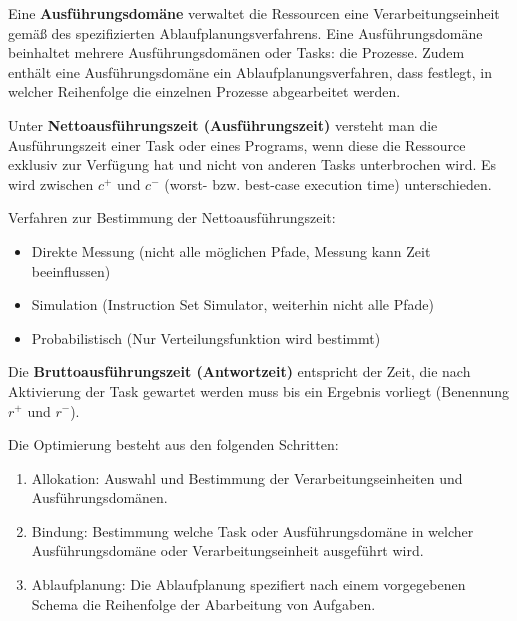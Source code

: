 \begin{tcolorbox}
    Eine \textbf{Ausführungsdomäne} verwaltet die Ressourcen eine Verarbeitungseinheit
    gemäß des spezifizierten Ablaufplanungsverfahrens. Eine Ausführungsdomäne
    beinhaltet mehrere Ausführungsdomänen oder Tasks: die Prozesse.
    Zudem enthält eine Ausführungsdomäne ein Ablaufplanungsverfahren, dass festlegt,
    in welcher Reihenfolge die einzelnen Prozesse abgearbeitet werden.
\end{tcolorbox}

\begin{tcolorbox}
    Unter \textbf{Nettoausführungszeit (Ausführungszeit)} versteht man die Ausführungszeit
    einer Task oder eines Programs, wenn diese die Ressource exklusiv zur Verfügung hat
    und nicht von anderen Tasks unterbrochen wird. Es wird zwischen $c^+$ und $c^-$
    (worst- bzw. best-case execution time) unterschieden.
\end{tcolorbox}

Verfahren zur Bestimmung der Nettoausführungszeit:
\begin{itemize}
    \item Direkte Messung (nicht alle möglichen Pfade, Messung kann Zeit beeinflussen)
    \item Simulation (Instruction Set Simulator, weiterhin nicht alle Pfade)
    \item Probabilistisch (Nur Verteilungsfunktion wird bestimmt)
\end{itemize}

\begin{tcolorbox}
    Die \textbf{Bruttoausführungszeit (Antwortzeit)} entspricht der Zeit, die nach
    Aktivierung der Task gewartet werden muss bis ein Ergebnis vorliegt (Benennung
    $r^+$ und $r^-$).
\end{tcolorbox}

Die Optimierung besteht aus den folgenden Schritten:
\begin{enumerate}
    \item Allokation: Auswahl und Bestimmung der Verarbeitungseinheiten und
        Ausführungsdomänen. 
    \item Bindung: Bestimmung welche Task oder Ausführungsdomäne in welcher
        Ausführungsdomäne oder Verarbeitungseinheit ausgeführt wird.
    \item Ablaufplanung: Die Ablaufplanung spezifiert nach einem vorgegebenen Schema die
        Reihenfolge der Abarbeitung von Aufgaben.
\end{enumerate}

